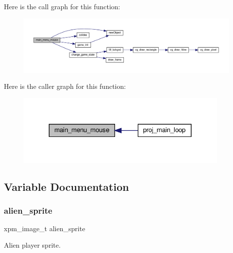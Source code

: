 Here is the call graph for this function\+:\nopagebreak
\begin{figure}[H]
\begin{center}
\leavevmode
\includegraphics[width=350pt]{group__Main-Menu_ga4a8e0e77f8775d3742bbda1b8c48fd3c_cgraph}
\end{center}
\end{figure}
Here is the caller graph for this function\+:\nopagebreak
\begin{figure}[H]
\begin{center}
\leavevmode
\includegraphics[width=299pt]{group__Main-Menu_ga4a8e0e77f8775d3742bbda1b8c48fd3c_icgraph}
\end{center}
\end{figure}


\subsection{Variable Documentation}
\mbox{\label{group__Main-Menu_ga69acbc91c439d0d9f047cbe70ade84cc}} 
\subsubsection{\texorpdfstring{alien\+\_\+sprite}{alien\_sprite}}
{\footnotesize\ttfamily xpm\+\_\+image\+\_\+t alien\+\_\+sprite}



Alien player sprite. 

\mbox{\label{group__Main-Menu_ga45f80f61d0103ffc208c2d0493380fb2}} 
